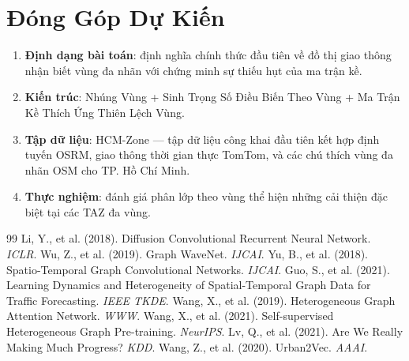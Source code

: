 \documentclass[12pt,a4paper]{article}
\begin{document}
\section{Đóng Góp Dự Kiến}

\begin{enumerate}
    \item \textbf{Định dạng bài toán}: định nghĩa chính thức đầu tiên về đồ thị giao thông
          nhận biết vùng đa nhãn với chứng minh sự thiếu hụt của ma trận kề.
    \item \textbf{Kiến trúc}: Nhúng Vùng + Sinh Trọng Số Điều Biến Theo Vùng
          + Ma Trận Kề Thích Ứng Thiên Lệch Vùng.
    \item \textbf{Tập dữ liệu}: HCM-Zone — tập dữ liệu công khai đầu tiên kết hợp định tuyến OSRM,
          giao thông thời gian thực TomTom, và các chú thích vùng đa nhãn OSM cho
          TP. Hồ Chí Minh.
    \item \textbf{Thực nghiệm}: đánh giá phân lớp theo vùng thể hiện những
          cải thiện đặc biệt tại các TAZ đa vùng.
\end{enumerate}

\begin{thebibliography}{99}
 Li, Y., et al. (2018). Diffusion Convolutional Recurrent Neural
Network. \textit{ICLR}.
 Wu, Z., et al. (2019). Graph WaveNet. \textit{IJCAI}.
 Yu, B., et al. (2018). Spatio-Temporal Graph Convolutional Networks.
\textit{IJCAI}.
 Guo, S., et al. (2021). Learning Dynamics and Heterogeneity of
Spatial-Temporal Graph Data for Traffic Forecasting. \textit{IEEE TKDE}.
 Wang, X., et al. (2019). Heterogeneous Graph Attention
Network. \textit{WWW}.
 Wang, X., et al. (2021). Self-supervised Heterogeneous Graph
Pre-training. \textit{NeurIPS}.
 Lv, Q., et al. (2021). Are We Really Making Much Progress? \textit{KDD}.
 Wang, Z., et al. (2020). Urban2Vec. \textit{AAAI}.
\end{thebibliography}
\end{document}
